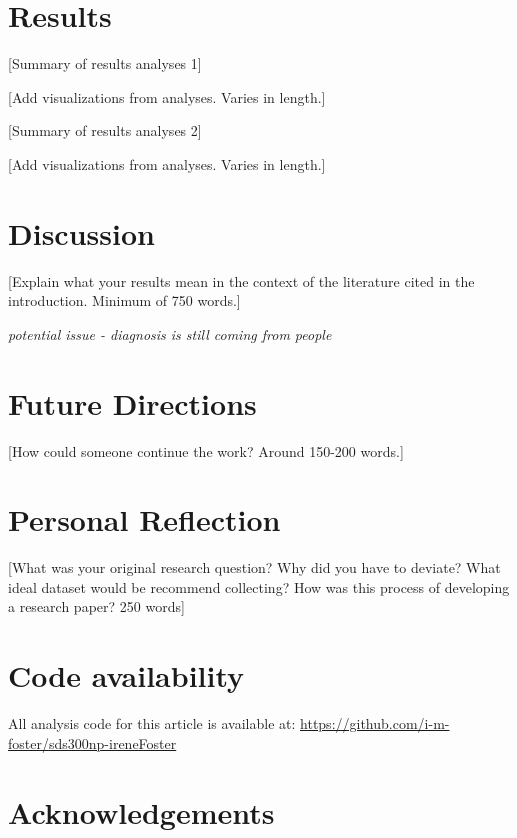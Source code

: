\documentclass[,article,submit,moreauthors,pdftex]{mdpi}
\begin{document}
\hypertarget{results}{%
\section{Results}\label{results}}

{[}Summary of results analyses 1{]}

{[}Add visualizations from analyses. Varies in length.{]}

{[}Summary of results analyses 2{]}

{[}Add visualizations from analyses. Varies in length.{]}

\hypertarget{discussion}{%
\section{Discussion}\label{discussion}}

{[}Explain what your results mean in the context of the literature cited
in the introduction. Minimum of 750 words.{]}

\emph{potential issue - diagnosis is still coming from people}

\hypertarget{future-directions}{%
\section{Future Directions}\label{future-directions}}

{[}How could someone continue the work? Around 150-200 words.{]}

\hypertarget{personal-reflection}{%
\section{Personal Reflection}\label{personal-reflection}}

{[}What was your original research question? Why did you have to
deviate? What ideal dataset would be recommend collecting? How was this
process of developing a research paper? 250 words{]}

\hypertarget{code-availability}{%
\section{Code availability}\label{code-availability}}

All analysis code for this article is available at:
\url{https://github.com/i-m-foster/sds300np-ireneFoster}

\hypertarget{acknowledgements}{%
\section{Acknowledgements}\label{acknowledgements}}
\end{document}
